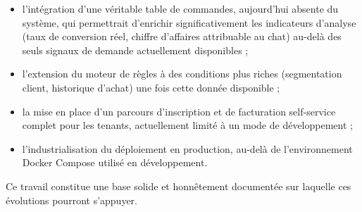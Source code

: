 \begin{itemize}
    \item l'intégration d'une véritable table de commandes, aujourd'hui absente du système, qui permettrait d'enrichir significativement les indicateurs d'analyse (taux de conversion réel, chiffre d'affaires attribuable au chat) au-delà des seuls signaux de demande actuellement disponibles ;
    \item l'extension du moteur de règles à des conditions plus riches (segmentation client, historique d'achat) une fois cette donnée disponible ;
    \item la mise en place d'un parcours d'inscription et de facturation self-service complet pour les tenants, actuellement limité à un mode de développement ;
    \item l'industrialisation du déploiement en production, au-delà de l'environnement Docker Compose utilisé en développement.
\end{itemize}

Ce travail constitue une base solide et honnêtement documentée sur laquelle ces évolutions pourront s'appuyer.
